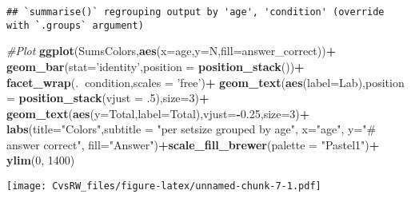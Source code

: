 \documentclass[
]{article}
\newenvironment{Shaded}{\begin{snugshade}}{\end{snugshade}}
\newcommand{\CommentTok}[1]{\textcolor[rgb]{0.56,0.35,0.01}{\textit{#1}}}
\newcommand{\DataTypeTok}[1]{\textcolor[rgb]{0.13,0.29,0.53}{#1}}
\newcommand{\DecValTok}[1]{\textcolor[rgb]{0.00,0.00,0.81}{#1}}
\newcommand{\FloatTok}[1]{\textcolor[rgb]{0.00,0.00,0.81}{#1}}
\newcommand{\KeywordTok}[1]{\textcolor[rgb]{0.13,0.29,0.53}{\textbf{#1}}}
\newcommand{\NormalTok}[1]{#1}
\newcommand{\OperatorTok}[1]{\textcolor[rgb]{0.81,0.36,0.00}{\textbf{#1}}}
\newcommand{\StringTok}[1]{\textcolor[rgb]{0.31,0.60,0.02}{#1}}
\begin{document}
\begin{verbatim}
## `summarise()` regrouping output by 'age', 'condition' (override with `.groups` argument)
\end{verbatim}

\begin{Shaded}
\begin{Highlighting}[]
\CommentTok{#Plot}
\KeywordTok{ggplot}\NormalTok{(SumsColors,}\KeywordTok{aes}\NormalTok{(}\DataTypeTok{x=}\NormalTok{age,}\DataTypeTok{y=}\NormalTok{N,}\DataTypeTok{fill=}\NormalTok{answer_correct))}\OperatorTok{+}
\StringTok{  }\KeywordTok{geom_bar}\NormalTok{(}\DataTypeTok{stat=}\StringTok{'identity'}\NormalTok{,}\DataTypeTok{position =} \KeywordTok{position_stack}\NormalTok{())}\OperatorTok{+}
\StringTok{  }\KeywordTok{facet_wrap}\NormalTok{(.}\OperatorTok{~}\NormalTok{condition,}\DataTypeTok{scales =} \StringTok{'free'}\NormalTok{)}\OperatorTok{+}
\StringTok{  }\KeywordTok{geom_text}\NormalTok{(}\KeywordTok{aes}\NormalTok{(}\DataTypeTok{label=}\NormalTok{Lab),}\DataTypeTok{position =} \KeywordTok{position_stack}\NormalTok{(}\DataTypeTok{vjust =} \FloatTok{.5}\NormalTok{),}\DataTypeTok{size=}\DecValTok{3}\NormalTok{)}\OperatorTok{+}
\StringTok{  }\KeywordTok{geom_text}\NormalTok{(}\KeywordTok{aes}\NormalTok{(}\DataTypeTok{y=}\NormalTok{Total,}\DataTypeTok{label=}\NormalTok{Total),}\DataTypeTok{vjust=}\OperatorTok{-}\FloatTok{0.25}\NormalTok{,}\DataTypeTok{size=}\DecValTok{3}\NormalTok{)}\OperatorTok{+}
\StringTok{  }\KeywordTok{labs}\NormalTok{(}\DataTypeTok{title=}\StringTok{"Colors"}\NormalTok{,}\DataTypeTok{subtitle =} \StringTok{"per setsize grouped by age"}\NormalTok{, }\DataTypeTok{x=}\StringTok{"age"}\NormalTok{, }\DataTypeTok{y=}\StringTok{"# answer correct"}\NormalTok{, }\DataTypeTok{fill=}\StringTok{"Answer"}\NormalTok{)}\OperatorTok{+}\KeywordTok{scale_fill_brewer}\NormalTok{(}\DataTypeTok{palette =} \StringTok{"Pastel1"}\NormalTok{)}\OperatorTok{+}
\StringTok{  }\KeywordTok{ylim}\NormalTok{(}\DecValTok{0}\NormalTok{, }\DecValTok{1400}\NormalTok{)}
\end{Highlighting}
\end{Shaded}

\texttt{[image: CvsRW\_files/figure-latex/unnamed-chunk-7-1.pdf]}
\end{document}
